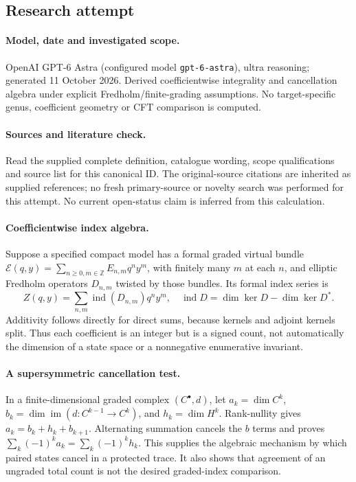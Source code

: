 \documentclass[11pt]{article}
\begin{document}
\subsection{Research attempt}
\paragraph{Model, date and investigated scope.}
OpenAI GPT-6 Astra (configured model \texttt{gpt-6-astra}), ultra reasoning; generated 11 October 2026. Derived coefficientwise integrality and cancellation algebra under explicit Fredholm/finite-grading assumptions. No target-specific genus, coefficient geometry or CFT comparison is computed.

\paragraph{Sources and literature check.}
Read the supplied complete definition, catalogue wording, scope qualifications and source list for this canonical ID. The original-source citations are inherited as supplied references; no fresh primary-source or novelty search was performed for this attempt. No current open-status claim is inferred from this calculation.

\paragraph{Coefficientwise index algebra.}Suppose a specified compact model has a formal graded virtual bundle \(\mathcal E(q,y)=\sum_{n\ge0,m\in\mathbb Z}E_{n,m}q^ny^m\), with finitely many \(m\) at each \(n\), and elliptic Fredholm operators \(D_{n,m}\) twisted by those bundles. Its formal index series is
\[Z(q,y)=\sum_{n,m}\operatorname{ind}(D_{n,m})q^ny^m,\quad
\operatorname{ind}D=\dim\ker D-\dim\ker D^*.
\]
Additivity follows directly for direct sums, because kernels and adjoint kernels split. Thus each coefficient is an integer but is a signed count, not automatically the dimension of a state space or a nonnegative enumerative invariant.
\paragraph{A supersymmetric cancellation test.}In a finite-dimensional graded complex \((C^\bullet,d)\), let \(a_k=\dim C^k\), \(b_k=\dim\operatorname{im}(d:C^{k-1}\to C^k)\), and \(h_k=\dim H^k\). Rank-nullity gives \(a_k=b_k+h_k+b_{k+1}\). Alternating summation cancels the \(b\) terms and proves \(\sum_k(-1)^ka_k=\sum_k(-1)^kh_k\). This supplies the algebraic mechanism by which paired states cancel in a protected trace. It also shows that agreement of an ungraded total count is not the desired graded-index comparison.
\end{document}
